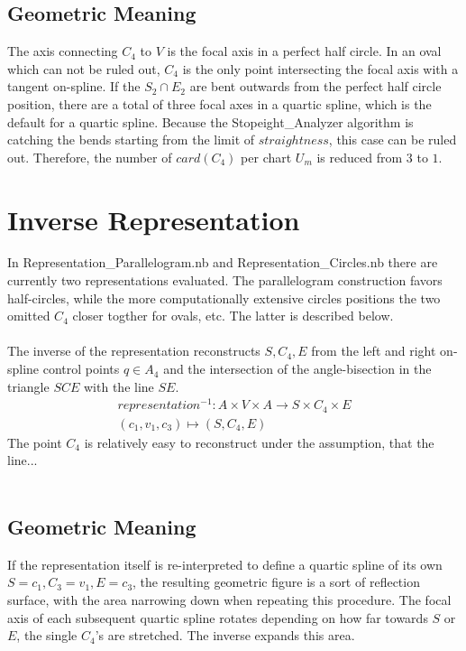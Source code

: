 \documentclass[a4paper,portrait]{report}
\begin{document}
\section{Geometric Meaning}
The axis connecting $C_{4}$ to $V$ is the focal axis in a perfect half circle. In an oval which can not be ruled out, $C_{4}$ is the only point intersecting the focal axis with a tangent on-spline. If the $S_{2}\cap E_{2}$ are bent outwards from the perfect half circle position, there are a total of three focal axes in a quartic spline, which is the default for a quartic spline. Because the Stopeight\_Analyzer algorithm is catching the bends starting from the limit of $straightness$, this case can be ruled out. Therefore, the number of $card(C_{4})$ per chart $U_{m}$ is reduced from $3$ to $1$.

\chapter{Inverse Representation}
In Representation\_Parallelogram.nb and Representation\_Circles.nb there are currently two representations evaluated. The parallelogram construction favors half-circles, while the more computationally extensive circles positions the two omitted $C_{4}$ closer togther for ovals, etc. The latter is described below.\\\\
The inverse of the representation reconstructs $S,C_{4},E$ from the left and right on-spline control points $q \in A_{4}$ and the intersection of the angle-bisection in the triangle $SCE$ with the line $SE$.
\begin{align}
representation^{-1}: A \times V \times A \rightarrow S \times C_{4} \times E\\
(c_{1},v_{1},c_{3})\mapsto(S,C_{4},E)
\end{align}
The point $C_{4}$ is relatively easy to reconstruct under the assumption, that the line...\\\\
\section{Geometric Meaning}
If the representation itself is re-interpreted to define a quartic spline of its own $S=c_{1},C_{3}=v_{1},E=c_{3}$, the resulting geometric figure is a sort of reflection surface, with the area narrowing down when repeating this procedure. The focal axis of each subsequent quartic spline rotates depending on how far towards $S$ or $E$, the single $C_{4}$'s are stretched. The inverse expands this area.
\end{document}
